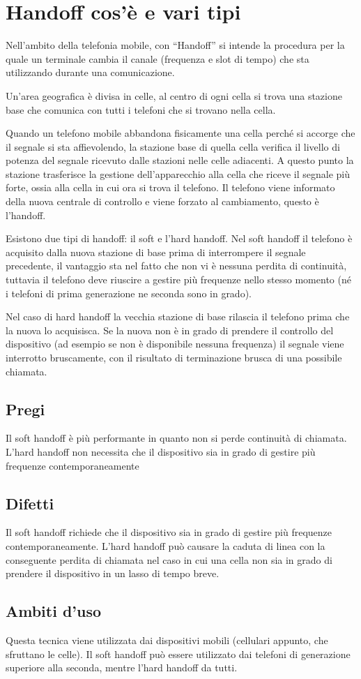 \section{Handoff cos’è e vari tipi}

Nell’ambito della telefonia mobile, con “Handoff” si intende la procedura per la quale un terminale cambia il canale (frequenza e slot di tempo) che sta utilizzando durante una comunicazione.

Un’area geografica è divisa in celle, al centro di ogni cella si trova una stazione base che comunica con tutti i telefoni che si trovano nella cella.

Quando un telefono mobile abbandona fisicamente una cella perché si accorge che il segnale si sta affievolendo, la stazione base di quella cella verifica il livello di potenza del segnale ricevuto dalle stazioni nelle celle adiacenti. A questo punto la stazione trasferisce la gestione dell’apparecchio alla cella che riceve il segnale più forte, ossia alla cella in cui ora si trova il telefono.
Il telefono viene informato della nuova centrale di controllo e viene forzato al cambiamento, questo è l’handoff.

Esistono due tipi di handoff: il soft e l’hard handoff. Nel soft handoff il telefono è acquisito dalla nuova stazione di base prima di interrompere il segnale precedente, il vantaggio sta nel fatto che non vi è nessuna perdita di continuità, tuttavia il telefono deve riuscire a gestire più frequenze nello stesso momento (né i telefoni di prima generazione ne seconda sono in grado).

Nel caso di hard handoff la vecchia stazione di base rilascia il telefono prima che la nuova lo acquisisca. Se la nuova non è in grado di prendere il controllo del dispositivo (ad esempio se non è disponibile nessuna frequenza) il segnale viene interrotto bruscamente, con il risultato di terminazione brusca di una possibile chiamata.
\subsection{Pregi}
Il soft handoff è più performante in quanto non si perde continuità di chiamata.
L'hard handoff non necessita che il dispositivo sia in grado di gestire più frequenze contemporaneamente
\subsection{Difetti}
Il soft handoff richiede che il dispositivo sia in grado di gestire più frequenze contemporaneamente.
L'hard handoff può causare la caduta di linea con la conseguente perdita di chiamata nel caso in cui una cella non sia in grado di prendere il dispositivo in un lasso di tempo breve.
\subsection{Ambiti d'uso}
Questa tecnica viene utilizzata dai dispositivi mobili (cellulari appunto, che sfruttano le celle). Il soft handoff può essere utilizzato dai telefoni di generazione superiore alla seconda, mentre l'hard handoff da tutti.

